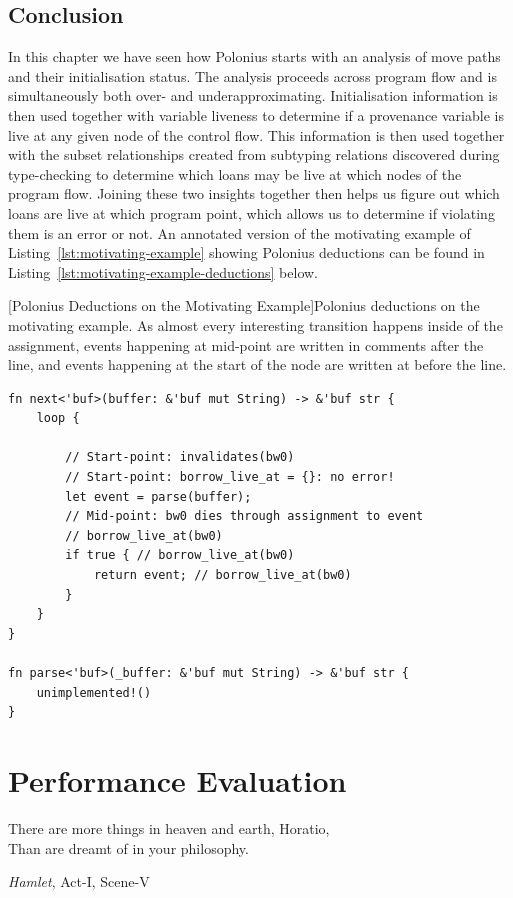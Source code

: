 \documentclass[11pt,a4paper,twoside,openany,draft]{report}
\newenvironment{sourcecode}{\captionsetup{type=listing}}{}
\begin{document}
\section{Conclusion}\label{sec:implementation:conclusion}

In this chapter we have seen how Polonius starts with an analysis of move paths
and their initialisation status. The analysis proceeds across program flow and
is simultaneously both over- and underapproximating. Initialisation information
is then used together with variable liveness to determine if a provenance
variable is live at any given node of the control flow. This information is
then used together with the subset relationships created from subtyping
relations discovered during type-checking to determine which loans may be live
at which nodes of the program flow. Joining these two insights together then
helps us figure out which loans are live at which program point, which allows us
to determine if violating them is an error or not. An annotated version of the
motivating example of Listing~\ref{lst:motivating-example} showing Polonius
deductions can be found in Listing~\ref{lst:motivating-example-deductions}
below.


\begin{sourcecode}
  [Polonius Deductions on the Motivating Example]{Polonius
    deductions on the motivating
    example. As almost every interesting transition happens inside of the
    assignment, events happening at mid-point are written in comments after the
    line, and events happening at the start of the node are written at before
    the line.}\label{lst:motivating-example-deductions}
\begin{verbatim}
fn next<'buf>(buffer: &'buf mut String) -> &'buf str {
    loop {

        // Start-point: invalidates(bw0)
        // Start-point: borrow_live_at = {}: no error!
        let event = parse(buffer); 
        // Mid-point: bw0 dies through assignment to event
        // borrow_live_at(bw0)
        if true { // borrow_live_at(bw0)
            return event; // borrow_live_at(bw0)
        }
    }
}

fn parse<'buf>(_buffer: &'buf mut String) -> &'buf str {
    unimplemented!()
}
\end{verbatim}
\end{sourcecode}


\chapter{Performance Evaluation}\label{sec:field-study-borrow}
\epigraph{There are more things in heaven and earth, Horatio,\\
  Than are dreamt of in your philosophy.}{\textit{Hamlet}, Act-I, Scene-V}
\end{document}
